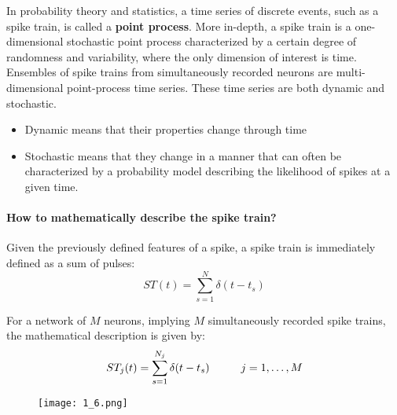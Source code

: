 In probability theory and statistics, a time series of discrete events, 
such as a spike train, is called a \textbf{point process}. More 
in-depth, a spike train is a one-dimensional stochastic point process characterized by a
certain degree of randomness and variability, where the only dimension of
interest is time.\\
Ensembles of spike trains from simultaneously recorded neurons are multi- 
dimensional point-process time series. These time series are both dynamic 
and stochastic. 

\begin{itemize}
    \item Dynamic means that their properties change through time
    \item Stochastic means that they change in a manner that can often be 
characterized by a probability model describing the likelihood of spikes 
at a given time. 
\end{itemize}

\paragraph{How to mathematically describe the spike train?} Given the
previously defined features of a spike, a spike train is immediately
defined as a sum of pulses:
\begin{equation*}
    ST(t) = \sum_{s=1}^N\delta(t-t_s)
\end{equation*}

For a network of \(M\) neurons, implying \(M\) simultaneously recorded
spike trains, the mathematical description is given by:
\begin{equation*}
    ST_j(t) = \sum_{s=1}^{N_j}\delta(t-t_s) \hspace{1 cm} j=1,\dots,M
\end{equation*}

\begin{figure}[h]
    \centering
    \texttt{[image: 1\_6.png]}
\end{figure}
\newpage
